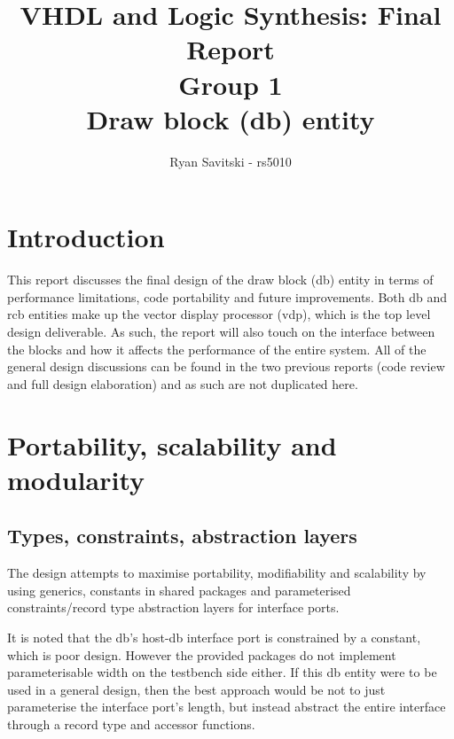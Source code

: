 \documentclass[]{article}
\title{VHDL and Logic Synthesis: Final Report\\
Group 1\\
Draw block (db) entity}
\author{Ryan Savitski - rs5010}
\date{} %
\begin{document}
\maketitle



\tableofcontents

\clearpage


\section{Introduction} %
\label{sec:introduction}

This report discusses the final design of the draw block (db) entity in terms of performance limitations, code portability and future improvements. Both db and rcb entities make up the vector display processor (vdp), which is the top level design deliverable. As such, the report will also touch on the interface between the blocks and how it affects the performance of the entire system. All of the general design discussions can be found in the two previous reports (code review and full design elaboration) and as such are not duplicated here.

\section{Portability, scalability and modularity} %
\label{sec:portability_scalability_and_modularity}


\subsection{Types, constraints, abstraction layers} %
\label{sub:types_constraints_abstraction_layers}


The design attempts to maximise portability, modifiability and scalability by using generics, constants in shared packages and parameterised constraints/record type abstraction layers for interface ports.

It is noted that the db's host-db interface port is constrained by a constant, which is poor design. However the provided packages do not implement parameterisable width on the testbench side either. If this db entity were to be used in a general design, then the best approach would be not to just parameterise the interface port's length, but instead abstract the entire interface through a record type and accessor functions.
\end{document}
